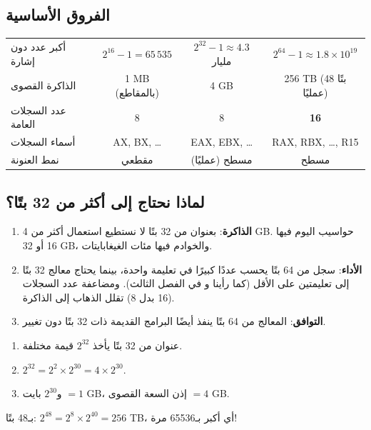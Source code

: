 \subsection{الفروق الأساسية}
\begin{center}
\small
\begin{tabularx}{\linewidth}{|>{\centering\arraybackslash}p{3.2cm}|C|C|C|}
    \hline
    \ras{} &  &  &  \\ \hline
    أكبر عدد دون إشارة & $2^{16}-1 = 65\,535$ & $2^{32}-1 \approx 4.3$ مليار & $2^{64}-1 \approx 1.8 \times 10^{19}$ \\ \hline
    الذاكرة القصوى & \textenglish{1 MB} (بالمقاطع) & \textenglish{4 GB} & \textenglish{256 TB} (48 بتًا عمليًا) \\ \hline
    عدد السجلات العامة & 8 & 8 & \textbf{16} \\ \hline
    أسماء السجلات & \textenglish{AX, BX, \dots} & \textenglish{EAX, EBX, \dots} & \textenglish{RAX, RBX, \dots, R15} \\ \hline
    نمط العنونة & مقطعي & مسطح (عمليًا) & مسطح \\ \hline
\end{tabularx}
\end{center}

\subsection{لماذا نحتاج إلى أكثر من 32 بتًا؟}
\begin{enumerate}
    \item \textbf{الذاكرة}: بعنوان من 32 بتًا لا نستطيع استعمال أكثر من \textenglish{4 GB}. حواسيب اليوم فيها
          \textenglish{16} أو \textenglish{32 GB}، والخوادم فيها مئات الغيغابايتات.
    \item \textbf{الأداء}: سجل من 64 بتًا يحسب عددًا كبيرًا في تعليمة واحدة، بينما يحتاج معالج 32 بتًا إلى
          تعليمتين على الأقل (كما رأينا  و في الفصل الثالث). ومضاعفة عدد السجلات (16 بدل 8)
          تقلل الذهاب إلى الذاكرة.
    \item \textbf{التوافق}: المعالج من 64 بتًا ينفذ أيضًا البرامج القديمة ذات 32 بتًا دون تغيير.
\end{enumerate}

\begin{khatwa}
    \begin{enumerate}
        \item عنوان من 32 بتًا يأخذ $2^{32}$ قيمة مختلفة.
        \item $2^{32} = 2^{2} \times 2^{30} = 4 \times 2^{30}$.
        \item و$2^{30}$ بايت $= 1$ \textenglish{GB}، إذن السعة القصوى $= 4$ \textenglish{GB}.
    \end{enumerate}
    بـ48 بتًا: $2^{48} = 2^{8} \times 2^{40} = 256$ \textenglish{TB}، أي أكبر بـ65536 مرة!
\end{khatwa}

